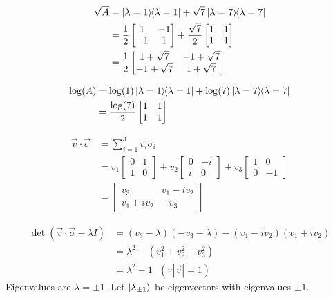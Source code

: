 \begin{align*}
	\sqrt{A} &= \ket{\lambda = 1}\hspace{-1mm} \bra{\lambda = 1} + \sqrt{7} \ket{\lambda = 7}\hspace{-1mm} \bra{\lambda = 7}\\
		&= \frac{1}{2} \begin{bmatrix}
		1 & -1 \\
		-1 & 1
		\end{bmatrix}
		+
		\frac{\sqrt{7}}{2} \begin{bmatrix}
		1 & 1 \\
		1 & 1
		\end{bmatrix}\\
		&=
		\frac{1}{2}
		 \begin{bmatrix}
			1+\sqrt{7} & -1+\sqrt{7} \\
			-1 + \sqrt{7} & 1+\sqrt{7}
		\end{bmatrix}
\end{align*}

 \begin{align*}
 	\log (A) &=  \log (1) \ket{\lambda = 1}\hspace{-1mm} \bra{\lambda = 1} + \log (7) \ket{\lambda = 7}\hspace{-1mm} \bra{\lambda = 7}\\
 		&= \frac{\log (7)}{2} \begin{bmatrix}
	 		1 & 1 \\
	 		1 & 1
 		\end{bmatrix}
 \end{align*}



\begin{align*}
	\vec{v} \cdot \vec{\sigma} &= \sum_{i=1}^3 v_i \sigma_i\\
		&= v_1 \begin{bmatrix}
		0 & 1 \\
		1 & 0
		\end{bmatrix}
		+ v_2 \begin{bmatrix}
		0 & -i \\
		i & 0
		\end{bmatrix}
		+ v_3 \begin{bmatrix}
		1 & 0 \\
		0 & -1
		\end{bmatrix} \\
		&= \begin{bmatrix}
		v_3 & v_1 - i v_2 \\
		v_1 + iv_2 & -v_3
		\end{bmatrix}
\end{align*}

\begin{align*}
	\det (\vec{v} \cdot \vec{\sigma}  - \lambda I) &= (v_3 - \lambda) (-v_3 - \lambda) - (v_1 - iv_2) (v_1 + iv_2)\\
			&= \lambda^2 - (v_1^2 + v_2^2  + v_3^2)\\
			&= \lambda^2 - 1 ~~~ (\because |\vec{v}| = 1)
\end{align*}
Eigenvalues are $\lambda = \pm 1$.
Let $\ket{\lambda_{ \pm 1 } }$ be eigenvectors with eigenvalues $\pm  1$.

